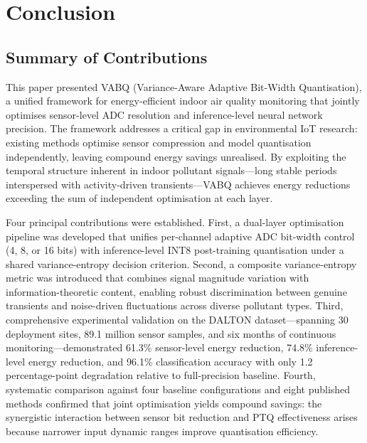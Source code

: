 \section{Conclusion}
\label{sec:conclusion}

\subsection{Summary of Contributions}
\label{sec:conc_summary}

This paper presented VABQ (Variance-Aware Adaptive Bit-Width Quantisation), a unified framework for energy-efficient indoor air quality monitoring that jointly optimises sensor-level ADC resolution and inference-level neural network precision. The framework addresses a critical gap in environmental IoT research: existing methods optimise sensor compression and model quantisation independently, leaving compound energy savings unrealised. By exploiting the temporal structure inherent in indoor pollutant signals---long stable periods interspersed with activity-driven transients---VABQ achieves energy reductions exceeding the sum of independent optimisation at each layer.

Four principal contributions were established. First, a dual-layer optimisation pipeline was developed that unifies per-channel adaptive ADC bit-width control (4, 8, or 16 bits) with inference-level INT8 post-training quantisation under a shared variance-entropy decision criterion. Second, a composite variance-entropy metric was introduced that combines signal magnitude variation with information-theoretic content, enabling robust discrimination between genuine transients and noise-driven fluctuations across diverse pollutant types. Third, comprehensive experimental validation on the DALTON dataset---spanning 30 deployment sites, 89.1 million sensor samples, and six months of continuous monitoring---demonstrated 61.3\% sensor-level energy reduction, 74.8\% inference-level energy reduction, and 96.1\% classification accuracy with only 1.2 percentage-point degradation relative to full-precision baseline. Fourth, systematic comparison against four baseline configurations and eight published methods confirmed that joint optimisation yields compound savings: the synergistic interaction between sensor bit reduction and PTQ effectiveness arises because narrower input dynamic ranges improve quantisation efficiency.

